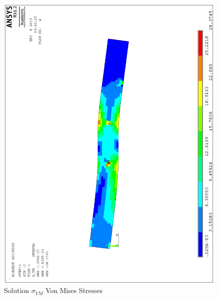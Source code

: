 \documentclass[letterpaper,12pt,]{article}
\begin{document}
\begin{landscape}
\newpage
\begin{figure}[h]
\centering
\includegraphics[width=1.0\textwidth,angle=-90]{tcasesol.eps}
\caption{Solution $\sigma_{VM}$ Von Mises Stresses}
\label{fig:res1}
\end{figure}

\end{landscape}
\end{document}
